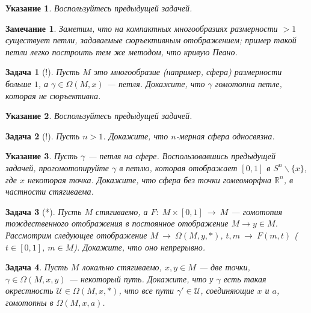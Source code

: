 \documentclass[12pt]{book}
\newcommand{\arrow}{{\:\longrightarrow\:}}
\def\R{{\mathbb R}}
\theoremstyle{upshape}
\newtheorem{zadacha}{Задача}[chapter]
\theoremstyle{generic}
\theoremstyle{upshapenonumber}
\newtheorem{ukazanie}{Указание}[section]
\newtheorem{zamechanie}{Замечание}[chapter]
\newcommand{\следствие}{%
     \refstepcounter{teorema}
     {\noindent\bf Следствие \thechapter.\arabic{teorema}:\ }}
\newcommand{\пример}{%
     \refstepcounter{teorema}
     {\noindent\bf Пример \thechapter.\arabic{teorema}:\ }}
\newcommand{\лемма}{%
     \refstepcounter{teorema}
     {\noindent\bf Лемма \thechapter.\arabic{teorema}:\ }}
\newcommand{\теорема}{%
     \refstepcounter{teorema}
     {\noindent\bf Теорема \thechapter.\arabic{teorema}:\ }}
\newcommand{\утверждение}{%
     \refstepcounter{teorema}
     {\noindent\bf Утверждение \thechapter.\arabic{teorema}:\ }}
\begin{document}
{\begin{ukazanie}
Воспользуйтесь предыдущей задачей.
\end{ukazanie}

\begin{zamechanie} Заметим, что на компактных 
многообразиях размерности $>1$ существует петли,
задаваемые сюръективным отображением; 
пример такой петли легко построить
тем же методом, что кривую Пеано.
\end{zamechanie}

\begin{zadacha}[!]
Пусть $M$ это многообразие (например, сфера) 
размерности больше $1$, а $\gamma\in \Omega(M, x)$ --- 
петля. Докажите, что $\gamma$ гомотопна петле, которая 
не сюръективна.
\end{zadacha}

\begin{ukazanie}
Воспользуйтесь предыдущей задачей.
\end{ukazanie}

\begin{zadacha}[!]
Пусть $n>1$. Докажите, что $n$-мерная сфера односвязна.
\end{zadacha}

\begin{ukazanie}
Пусть $\gamma$ --- петля на сфере.
Воспользовавшись предыдущей задачей, прогомотопируйте
$\gamma$ в петлю, которая отображает 
$[0,1]$ в $S^n\backslash \{x\}$, где $x$ некоторая
точка. Докажите, что сфера без точки гомеоморфна
$\R^n$, в частности стягиваема.
\end{ukazanie}

\begin{zadacha}[*] \label{_puti_iz_styagi_Zadacha_}
Пусть $M$ стягиваемо, а
$F:\; M\times [0,1]\arrow M$ --- гомотопия тождественного
отображения в постоянное отображение $M \to y \in M$. 
Рассмотрим следующее отображение
$M\arrow \Omega(M, y, *)$, $t, m \arrow F(m, t)$ 
($t\in[0,1]$, $m\in M$). Докажите, что оно непрерывно.
\end{zadacha}

\begin{zadacha} 
Пусть $M$ локально стягиваемо, $x, y\in M$ --- две точки,
$\gamma\in \Omega(M, x, y)$ --- некоторый путь. Докажите, что
у $\gamma$ есть такая окрестность ${\mathcal U}\in \Omega(M, x, *)$,
что все пути $\gamma'\in {\mathcal U}$, соединяющие
$x$ и $a$, гомотопны в $\Omega(M, x, a)$.
\end{zadacha}

}
\end{document}
